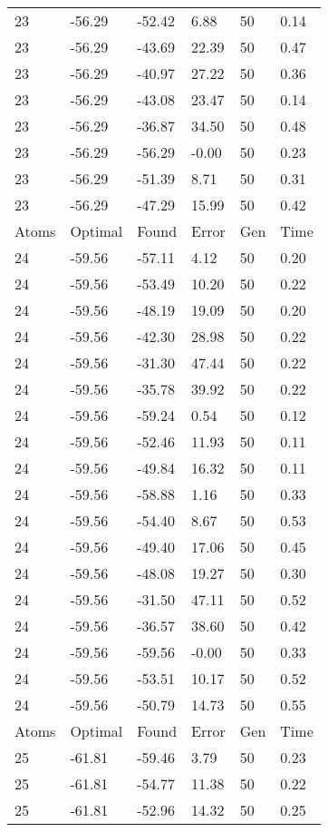 \documentclass{report}
\begin{document}
\begin{appendix}
\begin{longtable}{llllll}
23 & -56.29 & -52.42 & 6.88 & 50 & 0.14 \\
23 & -56.29 & -43.69 & 22.39 & 50 & 0.47 \\
23 & -56.29 & -40.97 & 27.22 & 50 & 0.36 \\
23 & -56.29 & -43.08 & 23.47 & 50 & 0.14 \\
23 & -56.29 & -36.87 & 34.50 & 50 & 0.48 \\
23 & -56.29 & -56.29 & -0.00 & 50 & 0.23 \\
23 & -56.29 & -51.39 & 8.71 & 50 & 0.31 \\
23 & -56.29 & -47.29 & 15.99 & 50 & 0.42 \\
Atoms & Optimal & Found & Error & Gen & Time \\
24 & -59.56 & -57.11 & 4.12 & 50 & 0.20 \\
24 & -59.56 & -53.49 & 10.20 & 50 & 0.22 \\
24 & -59.56 & -48.19 & 19.09 & 50 & 0.20 \\
24 & -59.56 & -42.30 & 28.98 & 50 & 0.22 \\
24 & -59.56 & -31.30 & 47.44 & 50 & 0.22 \\
24 & -59.56 & -35.78 & 39.92 & 50 & 0.22 \\
24 & -59.56 & -59.24 & 0.54 & 50 & 0.12 \\
24 & -59.56 & -52.46 & 11.93 & 50 & 0.11 \\
24 & -59.56 & -49.84 & 16.32 & 50 & 0.11 \\
24 & -59.56 & -58.88 & 1.16 & 50 & 0.33 \\
24 & -59.56 & -54.40 & 8.67 & 50 & 0.53 \\
24 & -59.56 & -49.40 & 17.06 & 50 & 0.45 \\
24 & -59.56 & -48.08 & 19.27 & 50 & 0.30 \\
24 & -59.56 & -31.50 & 47.11 & 50 & 0.52 \\
24 & -59.56 & -36.57 & 38.60 & 50 & 0.42 \\
24 & -59.56 & -59.56 & -0.00 & 50 & 0.33 \\
24 & -59.56 & -53.51 & 10.17 & 50 & 0.52 \\
24 & -59.56 & -50.79 & 14.73 & 50 & 0.55 \\
Atoms & Optimal & Found & Error & Gen & Time \\
25 & -61.81 & -59.46 & 3.79 & 50 & 0.23 \\
25 & -61.81 & -54.77 & 11.38 & 50 & 0.22 \\
25 & -61.81 & -52.96 & 14.32 & 50 & 0.25 \\

\end{longtable}
\end{appendix}
\end{document}
